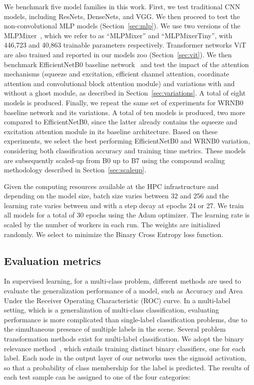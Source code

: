 \documentclass[journal]{IEEEtran}
\begin{document}
We benchmark five model families in this work. First, we test traditional CNN models, including ResNets, DenseNets, and VGG. We then proceed to test the non-convolutional MLP models (Section~\ref{sec:mlp}). We use two versions of the MLPMixer~\citep{tolstikhin2021mlpmixer}, which we refer to as ``MLPMixer'' and ``MLPMixerTiny'', with 446,723 and 40,863 trainable parameters respectively. Transformer networks ViT~\citep{DBLP:journals/corr/abs-2010-11929}
are also trained and reported in our models zoo (Section~\ref{sec:vit}). We then benchmark EfficientNetB0 baseline network~\citep{pmlr-v97-tan19a} and test the impact of the attention mechanisms (squeeze and excitation, efficient channel attention, coordinate attention and convolutional block attention module) and variations with and without a ghost module, as described in Section~\ref{sec:variations}. A total of eight models is produced. Finally, we repeat the same set of experiments for WRNB0 baseline network and its variations. A total of ten models is produced, two more compared to EfficientNetB0, since the latter already contains the squeeze and excitation attention module in its baseline architecture. Based on these experiments, we select the best performing EfficientNetB0 and WRNB0 variation, considering both classification accuracy and training time metrics. These models are subsequently scaled-up from B0 up to B7 using the compound scaling methodology described in Section~\ref{sec:scaleup}. 

Given the computing resources available at the HPC infrastructure and depending on the model size, batch size varies between 32 and 256 and the learning rate varies between  and  with a step decay at epochs 24 or 27. We train all models for a total of 30 epochs using the Adam optimizer. The learning rate is scaled by the number of workers in each run. The weights are initialized randomly. We select to minimize the Binary Cross Entropy loss function.

\subsection{Evaluation metrics}
\label{sec:metrics}
In supervised learning, for a multi-class problem, different methods are used to evaluate the generalization performance of a model, such as Accuracy and Area Under the Receiver Operating Characteristic (ROC) curve. In a multi-label setting, which is a generalization of multi-class classification, evaluating performance is more complicated than single-label classification problems, due to the simultaneous presence of multiple labels in the scene. Several problem transformation methods exist for multi-label classification. We adopt the binary relevance method~\citep{2011}, which entails training distinct binary classifiers, one for each label.
Each node in the output layer of our networks uses the sigmoid activation, so that a probability of class membership for the label is predicted. The results of each test sample can be assigned to one of the four categories:
\end{document}
